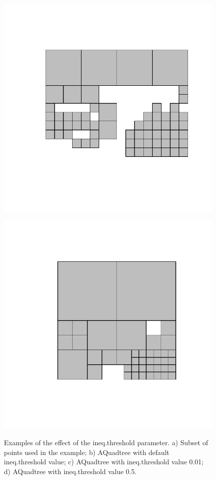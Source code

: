 \begin{figure}[ht!]
\begin{minipage}[b]{0.24\linewidth}
    \subcaption{}
    \label{fig:Fig7b}
  \end{minipage}
  \begin{minipage}[b]{0.24\linewidth}
    \includegraphics[width=\linewidth]{images/Fig7c}
    \subcaption{}
    \label{fig:Fig7c}
  \end{minipage}
  \begin{minipage}[b]{0.24\linewidth}
    \includegraphics[width=\linewidth]{images/Fig7d}
    \subcaption{}
    \label{fig:Fig7d}
  \end{minipage}
  \caption{Examples of the effect of the ineq.threshold parameter. a) Subset of points used in the example; b) AQuadtree with default ineq.threshold value; c) AQuadtree with ineq.threshold value 0.01; d) AQuadtree with ineq.threshold value 0.5.}
  \label{fig:Fig7}
\end{figure}
